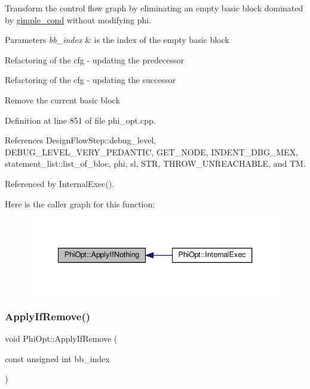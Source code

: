 Transform the control flow graph by eliminating an empty basic block dominated by \hyperlink{structgimple__cond}{gimple\+\_\+cond} without modifying phi. 


\begin{DoxyParams}{Parameters}
{\em bb\+\_\+index} & is the index of the empty basic block \\
\hline
\end{DoxyParams}
Refactoring of the cfg -\/ updating the predecessor

Refactoring of the cfg -\/ updating the successor

Remove the current basic block 

Definition at line 851 of file phi\+\_\+opt.\+cpp.



References Design\+Flow\+Step\+::debug\+\_\+level, D\+E\+B\+U\+G\+\_\+\+L\+E\+V\+E\+L\+\_\+\+V\+E\+R\+Y\+\_\+\+P\+E\+D\+A\+N\+T\+IC, G\+E\+T\+\_\+\+N\+O\+DE, I\+N\+D\+E\+N\+T\+\_\+\+D\+B\+G\+\_\+\+M\+EX, statement\+\_\+list\+::list\+\_\+of\+\_\+bloc, phi, sl, S\+TR, T\+H\+R\+O\+W\+\_\+\+U\+N\+R\+E\+A\+C\+H\+A\+B\+LE, and TM.



Referenced by Internal\+Exec().

Here is the caller graph for this function\+:
\nopagebreak
\begin{figure}[H]
\begin{center}
\leavevmode
\includegraphics[width=340pt]{dc/ddf/classPhiOpt_af2d1a2083c7f247ec714dfc73ee38de0_icgraph}
\end{center}
\end{figure}
\mbox{\label{classPhiOpt_a5d3aca47ec2f9f675c2f6ffbe2a5eef0}} 
\subsubsection{\texorpdfstring{Apply\+If\+Remove()}{ApplyIfRemove()}}
{\footnotesize\ttfamily void Phi\+Opt\+::\+Apply\+If\+Remove (\begin{DoxyParamCaption}\item[{const unsigned int}]{bb\+\_\+index }\end{DoxyParamCaption})\hspace{0.3cm}{\ttfamily [private]}}



